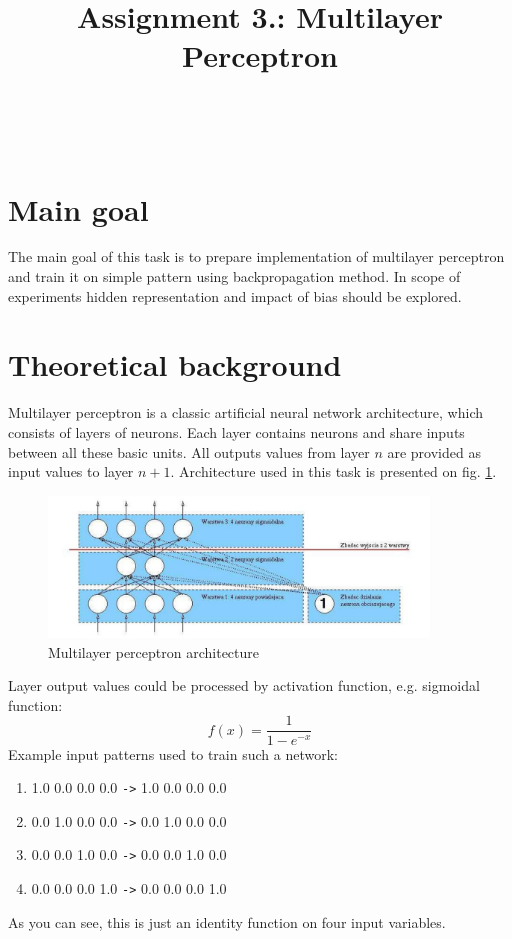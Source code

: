 \documentclass{classrep}
\author{%
    \studentinfo[239671@edu.p.lodz.pl]{Jan Karwowski}{239671}\\
    \studentinfo[239676@edu.p.lodz.pl]{Kamil Kowalewski}{239676}\\
}
\title{Assignment 3.: Multilayer Perceptron}
\begin{document}
    \maketitle
    \thispagestyle{fancyplain}

    \tableofcontents
    \newpage

    \section{Main goal}
    \label{main_goal} {
        The main goal of this task is to prepare implementation of multilayer perceptron and train
        it on simple pattern using backpropagation method. In scope of experiments hidden
        representation and impact of bias should be explored.
    }

    \section{Theoretical background} \label{theory} {
        Multilayer perceptron is a classic artificial neural network architecture, which consists of
        layers of neurons. Each layer contains neurons and share inputs between all these basic
        units. All outputs values from layer $n$ are provided as input values to layer $n+1$.
        Architecture used in this task is presented on fig. \ref{fig:multilayer_perceptron}.
        \begin{figure}[!htbp]
            \centering
            \includegraphics[width=0.9\textwidth]{img/multilayer_perceptron.jpg}
            \caption{Multilayer perceptron architecture}
            \label{fig:multilayer_perceptron}
        \end{figure}
        \FloatBarrier

        Layer output values could be processed by activation function, e.g. sigmoidal function:
        \begin{equation}
            f(x) = \frac{1}{1 - e^{-x}}
        \end{equation}
        Example input patterns used to train such a network:
        \begin{enumerate}
            \item 1.0 0.0 0.0 0.0 \verb|->| 1.0 0.0 0.0 0.0
            \item 0.0 1.0 0.0 0.0 \verb|->| 0.0 1.0 0.0 0.0
            \item 0.0 0.0 1.0 0.0 \verb|->| 0.0 0.0 1.0 0.0
            \item 0.0 0.0 0.0 1.0 \verb|->| 0.0 0.0 0.0 1.0
        \end{enumerate}
        As you can see, this is just an identity function on four input variables.
    }
\end{document}
